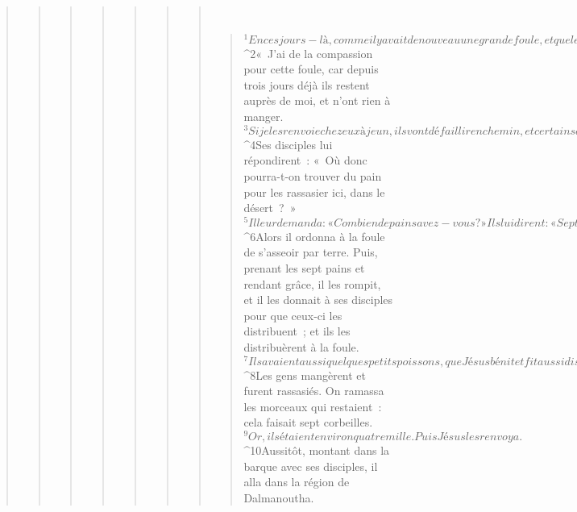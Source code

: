 \begin{verse}
\begin{verse}
\begin{verse}
\begin{verse}
\begin{verse}
\begin{verse}
\begin{verse}
         
      \bchapter{}
      \begin{verse}
${}^{1}En ces jours-là, comme il y avait de nouveau une grande foule, et que les gens n’avaient rien à manger, Jésus appelle à lui ses disciples et leur dit : 
${}^{2}« J’ai de la compassion pour cette foule, car depuis trois jours déjà ils restent auprès de moi, et n’ont rien à manger. 
${}^{3}Si je les renvoie chez eux à jeun, ils vont défaillir en chemin, et certains d’entre eux sont venus de loin. » 
${}^{4}Ses disciples lui répondirent : « Où donc pourra-t-on trouver du pain pour les rassasier ici, dans le désert ? » 
${}^{5}Il leur demanda : « Combien de pains avez-vous ? » Ils lui dirent : « Sept. » 
${}^{6}Alors il ordonna à la foule de s’asseoir par terre. Puis, prenant les sept pains et rendant grâce, il les rompit, et il les donnait à ses disciples pour que ceux-ci les distribuent ; et ils les distribuèrent à la foule. 
${}^{7}Ils avaient aussi quelques petits poissons, que Jésus bénit et fit aussi distribuer. 
${}^{8}Les gens mangèrent et furent rassasiés. On ramassa les morceaux qui restaient : cela faisait sept corbeilles. 
${}^{9}Or, ils étaient environ quatre mille. Puis Jésus les renvoya. 
${}^{10}Aussitôt, montant dans la barque avec ses disciples, il alla dans la région de Dalmanoutha.
      

\end{verse}
\end{verse}
\end{verse}
\end{verse}
\end{verse}
\end{verse}
\end{verse}
\end{verse}
